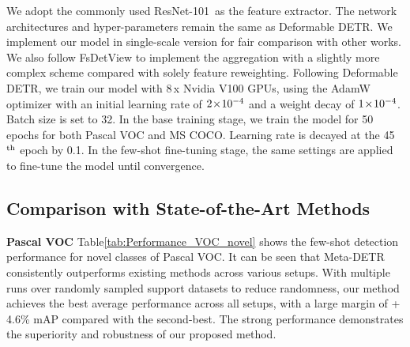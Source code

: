 \documentclass[letterpaper]{article} \usepackage{aaai22}  \usepackage{times}  \usepackage{helvet}  \usepackage{courier}  \usepackage[hyphens]{url}  \usepackage{graphicx} \urlstyle{rm} \def\UrlFont{\rm}  \usepackage{natbib}  \usepackage{caption} \DeclareCaptionStyle{ruled}{labelfont=normalfont,labelsep=colon,strut=off} \frenchspacing  \setlength{\pdfpagewidth}{8.5in}  \setlength{\pdfpageheight}{11in}  \usepackage{algorithm}
\begin{document}
We adopt the commonly used ResNet-101\,\cite{resnet} as the feature extractor. The network architectures and hyper-parameters remain the same as Deformable DETR\;\cite{DeformableDETR}. We implement our model in single-scale version for fair comparison with other works. We also follow FsDetView\;\cite{FSDetView} to implement the aggregation with a slightly more complex scheme compared with solely feature reweighting.
Following Deformable DETR, we train our model with 8\,x Nvidia V100 GPUs, using the AdamW\,\cite{AdamW} optimizer with an initial learning rate of $\rm 2\!\times\!10^{-4}$ and a weight decay of $\rm 1\!\times\!10^{-4}$. Batch size is set to 32. In the base training stage, we train the model for 50 epochs for both Pascal VOC and MS COCO. Learning rate is decayed at the 45$^{\rm th}$ epoch by 0.1. In the few-shot fine-tuning stage, the same settings are applied to fine-tune the model until convergence.


\subsection{Comparison with State-of-the-Art Methods}

\noindent\textbf{Pascal VOC\;\;}
Table\;\ref{tab:Performance_VOC_novel} shows the few-shot detection performance for novel classes of Pascal VOC. It can be seen that Meta-DETR consistently outperforms existing methods across various setups. With multiple runs over randomly sampled support datasets to reduce randomness, our method achieves the best average performance across all setups, with a large margin of +\,4.6\% mAP compared with the second-best. The strong performance demonstrates the superiority and robustness of our proposed method.
\end{document}
